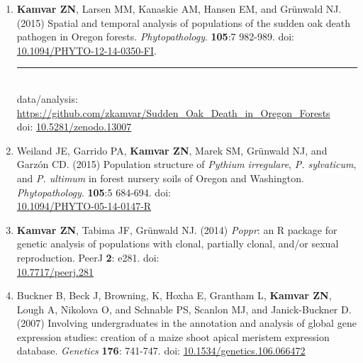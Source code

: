 \begin{enumerate}[leftmargin = 14pt]
	\vspace{3pt}

	\item \textbf{Kamvar ZN}, Larsen MM, Kanaskie AM, Hansen EM, and Gr\"unwald
	NJ. (2015) Spatial and temporal analysis of populations of the sudden oak
	death pathogen in Oregon forests. \textit{Phytopathology}. \textbf{105}:7
	982-989. doi:
	\href{http://doi.org/10.1094/PHYTO-12-14-0350-FI}{10.1094/PHYTO-12-14-0350-FI}.\\
	\rule[0.25\baselineskip]{0.25\textwidth}{0.5pt}\\
	data/analysis:
	\href{https://github.com/zkamvar/Sudden_Oak_Death_in_Oregon_Forests#readme}{https://github.com/zkamvar/Sudden\_Oak\_Death\_in\_Oregon\_Forests}\\
	doi:\phantom{t/analysis:}
	\href{https://doi.org/10.5281/zenodo.13007}{10.5281/zenodo.13007}

	\vspace{3pt}

	\item Weiland JE, Garrido PA, \textbf{Kamvar ZN}, Marek SM, Gr\"unwald NJ, and
	Garz\'on CD. (2015) Population structure of \textit{Pythium irregulare}, \textit{P.
	sylvaticum}, and \textit{P. ultimum} in forest nursery soils of Oregon and
	Washington. \textit{Phytopathology}. \textbf{105}:5 684-694. doi: \\
	\href{http://doi.org/10.1094/PHYTO-05-14-0147-R}{10.1094/PHYTO-05-14-0147-R}

	\vspace{3pt}

  \item \textbf{Kamvar ZN}, Tabima JF, Gr\"unwald NJ. (2014) \textit{Poppr}: an
	R package for genetic analysis of populations with clonal, partially clonal,
	and/or sexual reproduction. PeerJ \textbf{2}: e281. doi: \\
	\href{http://doi.org/10.7717/peerj.281}{10.7717/peerj.281}

	\vspace{3pt}

	\item Buckner B, Beck J, Browning, K, Hoxha E, Grantham L, \textbf{Kamvar
	ZN}, Lough A, Nikolova O, and Schnable PS, Scanlon MJ, and Janick-Buckner D.
	(2007) Involving undergraduates in the annotation and analysis of global
	gene expression studies: creation of a maize shoot apical meristem
	expression database. \textit{Genetics}
	\textbf{176}: 741-747. doi:
	\href{http://doi.org/10.1534/genetics.106.066472}{10.1534/genetics.106.066472}

\end{enumerate}

